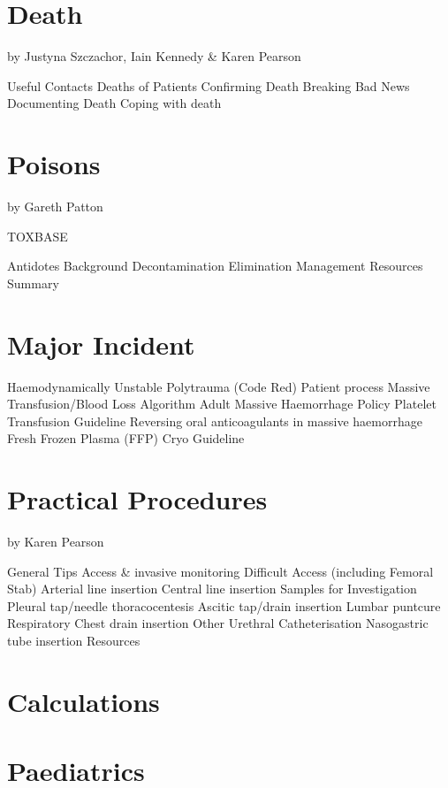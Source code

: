 \documentclass[]{book}
\begin{document}
\hypertarget{death}{%
\chapter{Death}\label{death}}

by Justyna Szczachor, Iain Kennedy \& Karen Pearson

Useful Contacts
Deaths of Patients
Confirming Death
Breaking Bad News
Documenting Death
Coping with death

\hypertarget{poisions}{%
\chapter{Poisons}\label{poisions}}

by Gareth Patton

TOXBASE

Antidotes
Background
Decontamination
Elimination
Management
Resources
Summary

\hypertarget{majinc}{%
\chapter{Major Incident}\label{majinc}}

Haemodynamically Unstable Polytrauma (Code Red)
Patient process
Massive Transfusion/Blood Loss Algorithm
Adult Massive Haemorrhage Policy
Platelet Transfusion Guideline
Reversing oral anticoagulants in massive haemorrhage
Fresh Frozen Plasma (FFP) Cryo Guideline

\hypertarget{practproc}{%
\chapter{Practical Procedures}\label{practproc}}

by Karen Pearson

General Tips
Access \& invasive monitoring
Difficult Access (including Femoral Stab)
Arterial line insertion
Central line insertion
Samples for Investigation
Pleural tap/needle thoracocentesis
Ascitic tap/drain insertion
Lumbar puntcure
Respiratory
Chest drain insertion
Other
Urethral Catheterisation
Nasogastric tube insertion
Resources

\hypertarget{calc}{%
\chapter{Calculations}\label{calc}}

\hypertarget{paeds}{%
\chapter{Paediatrics}\label{paeds}}
\end{document}
